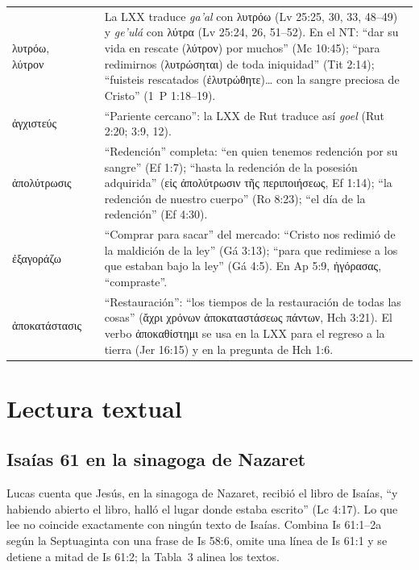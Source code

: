 \documentclass[11pt,letterpaper]{article}
\newcommand{\grc}[1]{\foreignlanguage{ancientgreek}{#1}}
\begin{document}
\begin{filologia}
\begin{tabular}{@{}L{3.3cm}L{1.4cm}L{9.85cm}@{}}
\grc{λυτρόω}, \grc{λύτρον} & & La LXX traduce \emph{ga'al} con \grc{λυτρόω} (Lv 25:25, 30, 33, 48--49) y \emph{ge'ulá} con \grc{λύτρα} (Lv 25:24, 26, 51--52). En el NT: ``dar su vida en rescate (\grc{λύτρον}) por muchos'' (Mc 10:45); ``para redimirnos (\grc{λυτρώσηται}) de toda iniquidad'' (Tit 2:14); ``fuisteis rescatados (\grc{ἐλυτρώθητε})\ldots{} con la sangre preciosa de Cristo'' (1~P 1:18--19). \\[2pt]
\grc{ἀγχιστεύς} & & ``Pariente cercano'': la LXX de Rut traduce así \emph{goel} (Rut 2:20; 3:9, 12). \\[2pt]
\grc{ἀπολύτρωσις} & & ``Redención'' completa: ``en quien tenemos redención por su sangre'' (Ef 1:7); ``hasta la redención de la posesión adquirida'' (\grc{εἰς ἀπολύτρωσιν τῆς περιποιήσεως}, Ef 1:14); ``la redención de nuestro cuerpo'' (Ro 8:23); ``el día de la redención'' (Ef 4:30). \\[2pt]
\grc{ἐξαγοράζω} & & ``Comprar para sacar'' del mercado: ``Cristo nos redimió de la maldición de la ley'' (Gá 3:13); ``para que redimiese a los que estaban bajo la ley'' (Gá 4:5). En Ap 5:9, \grc{ἠγόρασας}, ``compraste''. \\[2pt]
\grc{ἀποκατάστασις} & & ``Restauración'': ``los tiempos de la restauración de todas las cosas'' (\grc{ἄχρι χρόνων ἀποκαταστάσεως πάντων}, Hch 3:21). El verbo \grc{ἀποκαθίστημι} se usa en la LXX para el regreso a la tierra (Jer 16:15) y en la pregunta de Hch 1:6. \\
\end{tabular}
\end{filologia}

\section{Lectura textual}

\subsection{Isaías 61 en la sinagoga de Nazaret}
Lucas cuenta que Jesús, en la sinagoga de Nazaret, recibió el libro de Isaías, ``y habiendo abierto el libro, halló el lugar donde estaba escrito'' (Lc 4:17). Lo que lee no coincide exactamente con ningún texto de Isaías. Combina Is 61:1--2a según la Septuaginta con una frase de Is 58:6, omite una línea de Is 61:1 y se detiene a mitad de Is 61:2; la Tabla~3 alinea los textos.
\end{document}
